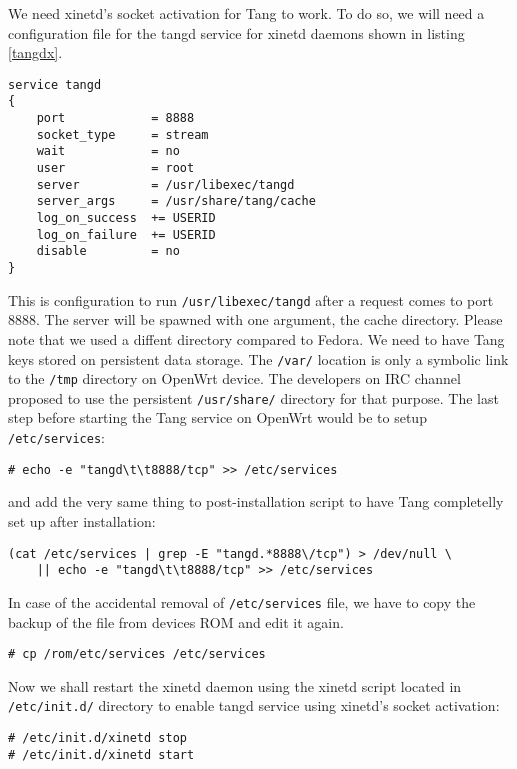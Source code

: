 We need xinetd's socket activation for Tang to work.
To do so, we will need a configuration file for the tangd service for xinetd daemons shown in listing \ref{tangdx}.
\begin{lstlisting}[columns=fixed,basicstyle=\ttfamily\footnotesize,tabsize=4,backgroundcolor=\color{yellow!10},caption=Configuration of Tang service for xinetd,label=tangdx]
service tangd
{
    port            = 8888
    socket_type     = stream
    wait            = no
    user            = root
    server          = /usr/libexec/tangd
    server_args     = /usr/share/tang/cache
    log_on_success  += USERID
    log_on_failure  += USERID
    disable         = no
}
\end{lstlisting}
This is configuration to run {\tt /usr/libexec/tangd} after a request comes to port 8888.
The server will be spawned with one argument, the cache directory.
Please note that we used a diffent directory compared to Fedora.
We need to have Tang keys stored on persistent data storage.
The {\tt /var/} location is only a symbolic link to the {\tt /tmp} directory on OpenWrt device.
The developers on IRC channel proposed to use the persistent {\tt /usr/share/} directory for that purpose.
The last step before starting the Tang service on OpenWrt would be to setup {\tt /etc/services}:
\begin{lstlisting}[columns=fixed,basicstyle=\ttfamily\footnotesize,tabsize=4,backgroundcolor=\color{yellow!10}]
# echo -e "tangd\t\t8888/tcp" >> /etc/services
\end{lstlisting}
and add the very same thing to post-installation script to have Tang completelly set up after installation:
\begin{lstlisting}[columns=fixed,basicstyle=\ttfamily\footnotesize,tabsize=4,backgroundcolor=\color{yellow!10}]
(cat /etc/services | grep -E "tangd.*8888\/tcp") > /dev/null \
    || echo -e "tangd\t\t8888/tcp" >> /etc/services
\end{lstlisting}
In case of the accidental removal of {\tt /etc/services} file, we have to copy the backup of the file from devices ROM and edit it again.
\begin{lstlisting}[columns=fixed,basicstyle=\ttfamily\footnotesize,tabsize=4,backgroundcolor=\color{yellow!10}]
# cp /rom/etc/services /etc/services
\end{lstlisting}
Now we shall restart the xinetd daemon using the xinetd script located in {\tt /etc/init.d/} directory to enable tangd service using xinetd's socket activation:
\begin{lstlisting}[columns=fixed,basicstyle=\ttfamily\footnotesize,tabsize=4,backgroundcolor=\color{yellow!10}]
# /etc/init.d/xinetd stop
# /etc/init.d/xinetd start
\end{lstlisting}
